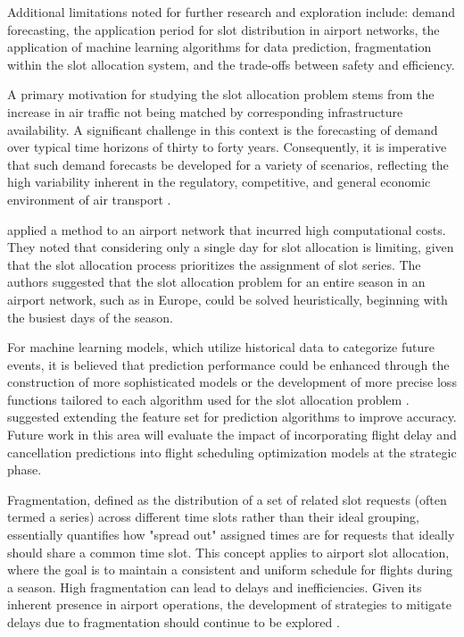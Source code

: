 Additional limitations noted for further research and exploration include: demand forecasting, the application period for slot distribution in airport networks, the application of machine learning algorithms for data prediction, fragmentation within the slot allocation system, and the trade-offs between safety and efficiency.

A primary motivation for studying the slot allocation problem stems from the increase in air traffic not being matched by corresponding infrastructure availability. A significant challenge in this context is the forecasting of demand over typical time horizons of thirty to forty years. Consequently, it is imperative that such demand forecasts be developed for a variety of scenarios, reflecting the high variability inherent in the regulatory, competitive, and general economic environment of air transport \cite{jacquillat_interairline_2018}.

 applied a method to an airport network that incurred high computational costs. They noted that considering only a single day for slot allocation is limiting, given that the slot allocation process prioritizes the assignment of slot series. The authors suggested that the slot allocation problem for an entire season in an airport network, such as in Europe, could be solved heuristically, beginning with the busiest days of the season.

For machine learning models, which utilize historical data to categorize future events, it is believed that prediction performance could be enhanced through the construction of more sophisticated models or the development of more precise loss functions tailored to each algorithm used for the slot allocation problem \cite{zografos_bi-objective_2019}.  suggested extending the feature set for prediction algorithms to improve accuracy. Future work in this area will evaluate the impact of incorporating flight delay and cancellation predictions into flight scheduling optimization models at the strategic phase.

Fragmentation, defined as the distribution of a set of related slot requests (often termed a series) across different time slots rather than their ideal grouping, essentially quantifies how "spread out" assigned times are for requests that ideally should share a common time slot. This concept applies to airport slot allocation, where the goal is to maintain a consistent and uniform schedule for flights during a season. High fragmentation can lead to delays and inefficiencies. Given its inherent presence in airport operations, the development of strategies to mitigate delays due to fragmentation should continue to be explored \cite{kuran_heuristic_nodate}.


